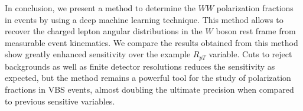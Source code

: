 In conclusion, we present a method to determine the $WW$ polarization fractions in
\ssWW events by using a deep machine learning technique.  This method
allows to recover the charged lepton angular distributions in the $W$
boson rest frame from measurable event kinematics.  We compare the
results obtained from this method show greatly enhanced sensitivity over
the example $R_{pT}$ variable.  Cuts to reject
backgrounds as well as finite detector resolutions reduces the sensitivity as
expected, but the method remains a powerful tool for the study of
polarization fractions in VBS events, almost doubling the ultimate precision when
compared to previous sensitive variables.


\begin{thebibliography}{99}

\end{thebibliography}

